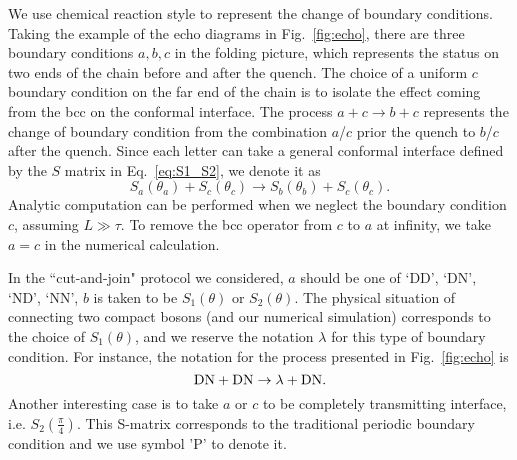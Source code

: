 
We use chemical reaction style to represent the change of boundary conditions. Taking the example of the echo diagrams in Fig.~\ref{fig:echo}, there are three boundary conditions $a,b,c$ in the folding picture, which represents the status on two ends of the chain before and after the quench. The choice of a uniform $c$ boundary condition on the far end of the chain is to isolate the effect coming from the bcc on the conformal interface. The process $a + c \rightarrow b + c$ represents the change of boundary condition from the combination $a$/$c$ prior the quench to $b$/$c$ after the quench. Since each letter can take a general conformal interface defined by the $S$ matrix in Eq.~\eqref{eq:S1_S2}, we denote it as
\begin{equation}
S_a( \theta_a ) + S_c( \theta_c) \rightarrow S_b( \theta_b )  + S_c( \theta_c ) .
\end{equation}
Analytic computation can be performed when we neglect the boundary condition $c$, assuming $L \gg \tau$. To remove the bcc operator from $c$ to $a$ at infinity, we take $a = c$ in the numerical calculation. 

In the ``cut-and-join" protocol we considered, $a$ should be one of `DD', `DN', `ND', `NN', $b$ is taken to be $S_1( \theta )$ or $S_2( \theta )$. The physical situation of connecting two compact bosons (and our numerical simulation) corresponds to the choice of $S_1( \theta)$, and we reserve the notation $\lambda$ for this type of boundary condition. For instance, the notation for the process presented in Fig.~\ref{fig:echo} is
\begin{equation}
{\rm DN }  + {\rm DN} \rightarrow \lambda + { \rm DN} .
\end{equation}
Another interesting case is to take $a$ or $c$ to be completely transmitting interface, i.e. $S_2( \frac{\pi}{4} )$. This S-matrix corresponds to the traditional periodic boundary condition and we use symbol 'P' to denote it. 



